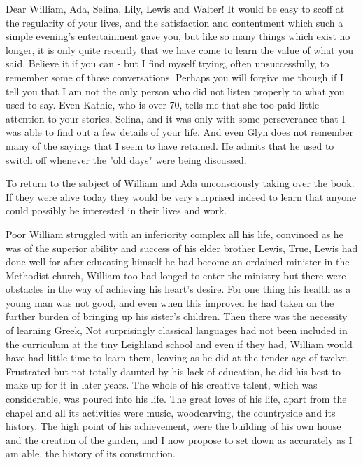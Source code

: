 Dear William, Ada, Selina, Lily, Lewis and Walter! It would be easy to scoff at the regularity of your lives, and the satisfaction and contentment which such a simple evening's entertainment gave you, but like so many things which exist no longer, it is only quite recently that we have come to learn the value of what you said. Believe it if you can - but I find myself trying, often unsuccessfully, to remember some of those conversations. Perhaps you will forgive me though if I tell you that I am not the only person who did not listen properly to what you used to say. Even Kathie, who is over 70, tells me that she too paid little attention to your stories, Selina, and it was only with some perseverance that I was able to find out a few details of your life. And even Glyn does not remember many of the sayings that I seem to have retained. He admits that he used to switch off whenever the "old days" were being discussed.

To return to the subject of William and Ada unconsciously taking over the book. If they were alive today they would be very surprised indeed to learn that anyone could possibly be interested in their lives and work.

Poor William struggled with an inferiority complex all his life, convinced as he was of the superior ability and success of his elder brother Lewis, True, Lewis had done well for after educating himself he had become an ordained minister in the Methodist church, William too had longed to enter the ministry but there were obstacles in the way of achieving his heart’s desire. For one thing his health as a young man was not good, and even when this improved he had taken on the further burden of bringing up his sister's children. Then there was the necessity of learning Greek, Not surprisingly classical languages had not been included in the curriculum at the tiny Leighland school and even if they had, William would have had little time to learn them, leaving as he did at the tender age of twelve. Frustrated but not totally daunted by his lack of education, he did his best to make up for it in later years. The whole of his creative talent, which was considerable, was poured into his life. The great loves of his life, apart from the chapel and all its activities were music, woodcarving, the countryside and its history. The high point of his achievement, were the building of his own house and the creation of the garden, and I now propose to set down as accurately as I am able, the history of its construction.